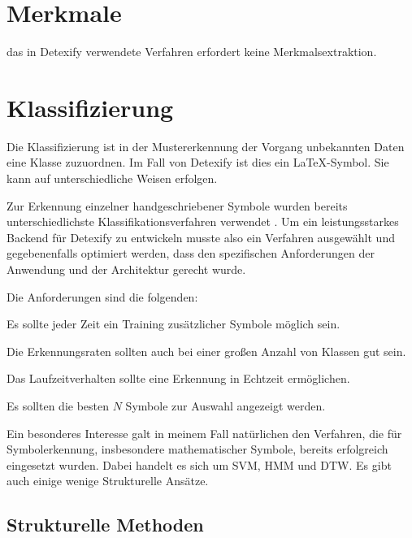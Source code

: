 
\section{Merkmale}
\label{sec:merkmale}

\TODO das in Detexify verwendete Verfahren erfordert keine Merkmalsextraktion.

\section{Klassifizierung} %
\label{sec:klassifizierung}

Die Klassifizierung ist in der Mustererkennung der Vorgang unbekannten Daten eine Klasse zuzuordnen. Im Fall von Detexify ist dies ein \LaTeX-Symbol. Sie kann auf unterschiedliche Weisen erfolgen.

Zur Erkennung einzelner handgeschriebener Symbole wurden bereits unterschiedlichste Klassifikationsverfahren verwendet \cite{Plamondon:2000p10303}. Um ein leistungsstarkes Backend für Detexify zu entwickeln musste also ein Verfahren ausgewählt und gegebenenfalls optimiert werden, dass den spezifischen Anforderungen der Anwendung und der Architektur gerecht wurde.

Die Anforderungen sind die folgenden:

\begin{description}
  \label{desc:anforderungen}
  \item[Adaptionsfähigkeit] Es sollte jeder Zeit ein Training zusätzlicher Symbole möglich sein.
  \item[Skalierbarkeit] Die Erkennungsraten sollten auch bei einer großen Anzahl von Klassen gut sein.
  \item[Laufzeitverhalten] Das Laufzeitverhalten sollte eine Erkennung in Echtzeit ermöglichen.
  \item[Interaktivität] Es sollten die besten $N$ Symbole zur Auswahl angezeigt werden. 
\end{description}

Ein besonderes Interesse galt in meinem Fall natürlichen den Verfahren, die für Symbolerkennung, insbesondere mathematischer Symbole, bereits erfolgreich eingesetzt wurden. Dabei handelt es sich um \ac{SVM}, \ac{HMM} und \ac{DTW}. Es gibt auch einige wenige Strukturelle Ansätze.

\subsection{Strukturelle Methoden}
\label{sub:strukturelle_methoden}


